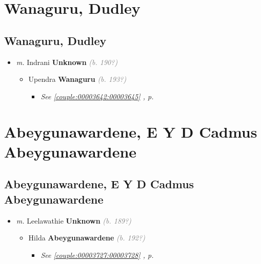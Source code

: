 \documentclass[10pt, openany]{book}
\begin{document}
\part{Wanaguru, Dudley}
\chapter{Wanaguru, Dudley}
\label{00003646}
\textcolor{slmaroon}{\textit{}}
\begin{itemize}
\item{\textit{m.} Indrani \textbf{Unknown} \textcolor{gray}{\textit{(b. 190?)}}   \label{couple:00003646:00003647} \begin{itemize}
\item{Upendra  \textbf{Wanaguru} \textcolor{gray}{\textit{(b. 193?)}}
\begin{itemize}
\item{\textcolor{slteal}{\textit{See  \autoref{couple:00003642:00003645} \textit{, p. \pageref{couple:00003642:00003645} }}}}
\end{itemize}
  }
\end{itemize}}
\end{itemize}
 
\part{Abeygunawardene, E Y D Cadmus Abeygunawardene}
\chapter{Abeygunawardene, E Y D Cadmus Abeygunawardene}
\label{00003729}
\textcolor{slmaroon}{\textit{}}
\begin{itemize}
\item{\textit{m.} Leelawathie \textbf{Unknown} \textcolor{gray}{\textit{(b. 189?)}}   \label{couple:00003729:00003730} \begin{itemize}
\item{Hilda \textbf{Abeygunawardene} \textcolor{gray}{\textit{(b. 192?)}}
\begin{itemize}
\item{\textcolor{slteal}{\textit{See  \autoref{couple:00003727:00003728} \textit{, p. \pageref{couple:00003727:00003728} }}}}
\end{itemize}
 }
\end{itemize}}
\end{itemize}
     
\end{document}
